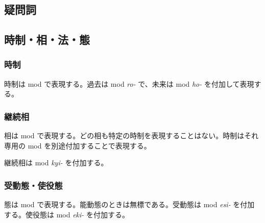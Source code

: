 \subsection{疑問詞}

\subsection{時制・相・法・態}

\subsubsection{時制}

時制は mod で表現する。過去は mod \emph{ro-} で、未来は mod \emph{ho-} を付加して表現する。

\subsubsection{継続相}

相は mod で表現する。どの相も特定の時制を表現することはない。時制はそれ専用の mod を別途付加することで表現する。

継続相は mod \emph{kyi-} を付加する。

\subsubsection{受動態・使役態}

態は mod で表現する。能動態のときは無標である。受動態は mod \emph{esi-} を付加する。使役態は mod \emph{eki-} を付加する。